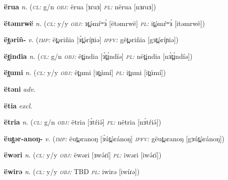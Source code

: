 \newentry
\headword\textbf{ërua}  
\ipa{[ɜɾuɜ]}
\synpos\textit{n.} 
\class(\textit{\textsc{cl:}} {g/n}
\object\textit{\textsc{obj:}} ërua [ɜɾuɜ]
\plural\textit{\textsc{pl:}} nërua [nɜɾuɜ])

\newentry
\headword\textbf{ëtəmrwë}  
\ipa{[ɜt̪ə́mŕʷɜ́]}
\synpos\textit{n.} 
\class(\textit{\textsc{cl:}} {y/y}
\object\textit{\textsc{obj:}} ɜt̪ə́mŕʷɜ́ [ëtəmrwë]
\plural\textit{\textsc{pl:}} it̪ə́mŕʷɜ́ [itəmrwë])


\newentry
\headword\textbf{ët̪əriñ-}  
\ipa{[ɜt̪ə́ríɲ-]}
\synpos\textit{v.} 
\imperative(\textit {\textsc{imp:}} ët̪əriñia [ɜ́t̪ə́ríɲiə] \imperfective\textit{\textsc{ipfv:}} gët̪əriñia [gɜt̪ə́ríɲiə])

\newentry
\headword\textbf{ët̪india}  
\ipa{[ɜ́t̪ɪ́ndíə]}
\synpos\textit{n.} 
\class(\textit{\textsc{cl:}} {g/n}
\object\textit{\textsc{obj:}} ët̪india [ɜ́t̪ɪ́ndíə]
\plural\textit{\textsc{pl:}} nët̪india [nɜ́t̪ɪ́ndíə])

\newentry
\headword\textbf{ët̪umi}  
\ipa{[ɜt̪úmí]}
\synpos\textit{n.} 
\class(\textit{\textsc{cl:}} {y/y}
\object\textit{\textsc{obj:}} ët̪umi [ɜt̪úmí]
\plural\textit{\textsc{pl:}} it̪umi [it̪úmí])


\newentry
\headword\textbf{ëtəni}  
\ipa{[ɜtəni]}
\synpos\textit{adv.} 

\newentry
\headword\textbf{ëtia}  
\ipa{[ɜt:iə]}
\synpos\textit{excl.} 

\newentry
\headword\textbf{ëtria}  
\ipa{[ɜ́tŕiə́]}
\synpos\textit{n.} 
\class(\textit{\textsc{cl:}} {g/n}
\object\textit{\textsc{obj:}} ëtria [ɜ́tŕiə́]
\plural\textit{\textsc{pl:}} nëtria [nɜ́tŕiə́])


\newentry
\headword\textbf{ëut̪ər-anoŋ-}  
\ipa{[ɜút̪ə́r-ánoŋ-]}
\synpos\textit{v.} 
\imperative(\textit {\textsc{imp:}} ëut̪əranoŋ [ɜ́út̪ə́ránoŋ] \imperfective\textit{\textsc{ipfv:}} gëut̪əranoŋ [gɜút̪ə́ránoŋ])

\newentry
\headword\textbf{ëwəri}  
\ipa{[ɜwə́ɾí]}
\synpos\textit{n.} 
\class(\textit{\textsc{cl:}} {y/y}
\object\textit{\textsc{obj:}} ëwəri [ɜwə́ɾí]
\plural\textit{\textsc{pl:}} iwəri [iwə́ɾí])

\newentry
\headword\textbf{ëwirə}  
\ipa{[ɜwíɾə]}
\synpos\textit{n.} 
\class(\textit{\textsc{cl:}} {y/y}
\object\textit{\textsc{obj:}} TBD
\plural\textit{\textsc{pl:}} iwirə [iwíɾə])

